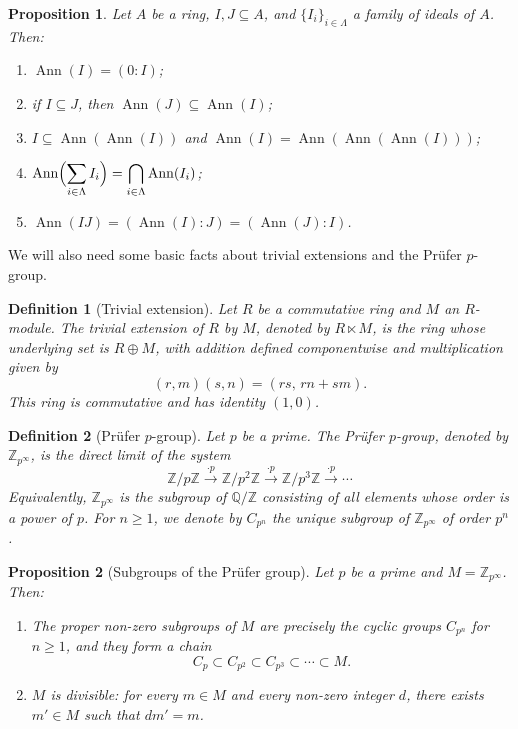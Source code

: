 \documentclass{amsart}
\newtheorem{proposition}{Proposition}
\newtheorem{definition}{Definition}
\DeclareMathOperator{\ann}{Ann}
\begin{document}
\begin{proposition}\label{pro:annihilator}
Let $A$ be a ring, $I,J\subseteq A$, and $\{I_i\}_{i\in\Lambda}$ a family of ideals of $A$. Then:
\begin{enumerate}
  \item $\ann(I)=(0:I)$;
  \item if $I\subseteq J$, then $\ann(J)\subseteq\ann(I)$;
  \item $I\subseteq\ann(\ann(I))$ and $\ann(I)=\ann(\ann(\ann(I)))$;
  \item $\displaystyle\ann\Bigl(\sum_{i\in\Lambda} I_i\Bigr)=\bigcap_{i\in\Lambda}\ann(I_i)$;
  \item $\ann(IJ)=(\ann(I):J)=(\ann(J):I)$.
\end{enumerate}
\end{proposition}

We will also need some basic facts about trivial extensions and the Pr\"ufer $p$-group.

\begin{definition}[Trivial extension]\label{def:trivial-extension}
Let $R$ be a commutative ring and $M$ an $R$-module. The \emph{trivial extension} of $R$ by $M$, denoted by $R\ltimes M$, is the ring whose underlying set is $R\oplus M$, with addition defined componentwise and multiplication given by
\[
(r,m)(s,n)=(rs,\,rn+sm).
\]
This ring is commutative and has identity $(1,0)$.
\end{definition}

\begin{definition}[Pr\"ufer $p$-group]\label{def:prufer}
Let $p$ be a prime. The \emph{Pr\"ufer $p$-group}, denoted by $\mathbb Z_{p^\infty}$, is the direct limit of the system
\[
\mathbb Z/p\mathbb Z \xrightarrow{\cdot p} \mathbb Z/p^2\mathbb Z \xrightarrow{\cdot p} \mathbb Z/p^3\mathbb Z \xrightarrow{\cdot p}\cdots
\]
Equivalently, $\mathbb Z_{p^\infty}$ is the subgroup of $\mathbb Q/\mathbb Z$ consisting of all elements whose order is a power of $p$. For $n\ge 1$, we denote by $C_{p^n}$ the unique subgroup of $\mathbb Z_{p^\infty}$ of order $p^n$.
\end{definition}

\begin{proposition}[Subgroups of the Pr\"ufer group]\label{prop:prufer-subgroups}
Let $p$ be a prime and $M=\mathbb Z_{p^\infty}$. Then:
\begin{enumerate}
  \item The proper non-zero subgroups of $M$ are precisely the cyclic groups $C_{p^n}$ for $n\ge 1$, and they form a chain
  \[
  C_p\subset C_{p^2}\subset C_{p^3}\subset\cdots\subset M.
  \]
  \item $M$ is divisible: for every $m\in M$ and every non-zero integer $d$, there exists $m'\in M$ such that $d m'=m$.
\end{enumerate}
\end{proposition}
\end{document}
